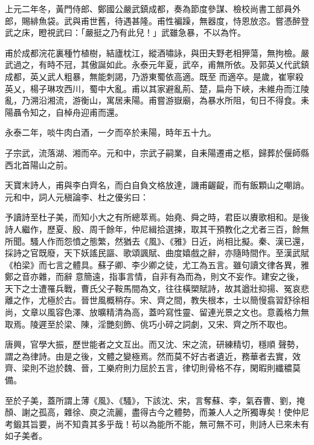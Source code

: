 \begin{pinyinscope}
 上元二年冬，黃門侍郎、鄭國公嚴武鎮成都，奏為節度參謀、檢校尚書工部員外郎，賜緋魚袋。武與甫世舊，待遇甚隆。甫性褊躁，無器度，恃恩放恣。嘗憑醉登武之床，瞪視武曰：「嚴挺之乃有此兒！」武雖急暴，不以為忤。



 甫於成都浣花裏種竹植樹，結廬枕江，縱酒嘯詠，與田夫野老相狎蕩，無拘檢。嚴武過之，有時不冠，其傲誕如此。永泰元年夏，武卒，甫無所依。及郭英乂代武鎮成都，英乂武人粗暴，無能刺謁，乃游東蜀依高適。既至
 而適卒。是歲，崔寧殺英乂，楊子琳攻西川，蜀中大亂。甫以其家避亂荊、楚，扁舟下峽，未維舟而江陵亂，乃溯沿湘流，游衡山，寓居耒陽。甫嘗游嶽廟，為暴水所阻，旬日不得食。耒陽聶令知之，自棹舟迎甫而還。



 永泰二年，啖牛肉白酒，一夕而卒於耒陽，時年五十九。



 子宗武，流落湖、湘而卒。元和中，宗武子嗣業，自耒陽遷甫之柩，歸葬於偃師縣西北首陽山之前。



 天寶末詩人，甫與李白齊名，而白自負文格放達，譏甫齷齪，而有飯顆山之嘲誚。
 元和中，詞人元稹論李、杜之優劣曰：



 予讀詩至杜子美，而知小大之有所總萃焉。始堯、舜之時，君臣以賡歌相和。是後詩人繼作，歷夏、殷、周千餘年，仲尼緝拾選揀，取其干預教化之尤者三百，餘無所聞。騷人作而怨憤之態繁，然猶去《風》、《雅》日近，尚相比擬。秦、漢已還，採詩之官既廢，天下妖謠民謳、歌頌諷賦、曲度嬉戲之辭，亦隨時間作。至漢武賦《柏梁》而七言之體具。蘇子卿、李少卿之徒，尤工為五言。雖句讀文律各異，雅鄭之音亦雜，而辭
 意簡遠，指事言情，自非有為而為，則文不妄作。建安之後，天下之士遭罹兵戰，曹氏父子鞍馬間為文，往往橫槊賦詩，故其遒壯抑揚、冤哀悲離之作，尤極於古。晉世風概稍存。宋、齊之間，教失根本，士以簡慢翕習舒徐相尚，文章以風容色澤、放曠精清為高，蓋吟寫性靈、留連光景之文也。意義格力無取焉。陵遲至於梁、陳，淫艷刻飾、佻巧小碎之詞劇，又宋、齊之所不取也。



 唐興，官學大振，歷世能者之文互出。而又沈、宋之流，研練精切，穩順
 聲勢，謂之為律詩。由是之後，文體之變極焉。然而莫不好古者遺近，務華者去實，效齊、梁則不迨於魏、晉，工樂府則力屈於五言，律切則骨格不存，閑暇則纖穠莫備。



 至於子美，蓋所謂上薄《風》、《騷》，下該沈、宋，言奪蘇、李，氣吞曹、劉，掩顏、謝之孤高，雜徐、庾之流麗，盡得古今之體勢，而兼人人之所獨專矣！使仲尼考鍛其旨要，尚不知貴其多乎哉！茍以為能所不能，無可無不可，則詩人已來未有如子美者。




\end{pinyinscope}
